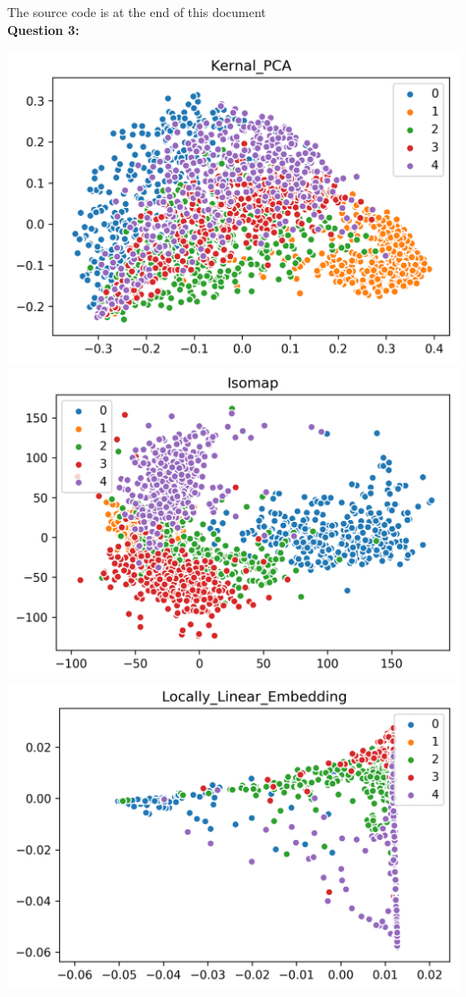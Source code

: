 \documentclass[12pt]{article}
\begin{document}
\noindent
{\LARGE The source code is at the end of this document}\\
\textbf{\large Question 3:}\\
\begin{center}
    \includegraphics[width=14cm]{Q3_Kernal_PCA.png}
    \includegraphics[width=14cm]{Q3_Isomap.png}
    \includegraphics[width=15cm]{Q3_Locally_Linear_Embedding.png}

\end{center}
\end{document}
